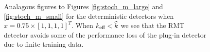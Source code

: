 \begin{figure}
\centering
{}
\vspace{-0.1in}
\caption{Analagous figures to Figures \ref{fig:stoch_m_large} and \ref{fig:stoch_m_small} for the deterministic detectors when $x=0.75\times[1,1,1,1]^T$. When $k_\text{eff}<\widehat{k}$ we see that the RMT detector avoids some of the performance loss of the plug-in detector due to finite training data.}
\label{fig:determ_m_effect}
\vspace{-0.2in}
\end{figure}

